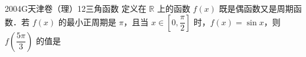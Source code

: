 
\begin{problem}{2004}{G}{天津卷（理）}{12}{三角函数}
定义在 $\mathbb{R}$ 上的函数 $f(x)$ 既是偶函数又是周期函数．若 $f(x)$ 的最小正周期是 $\pi$，且当 $x\in[0,\dfrac{\pi}{2}]$ 时，$f(x)=\sin x$，则 $f(\dfrac{5\pi}{3})$ 的值是
\begin{choices}
\end{choices}
\end{problem}